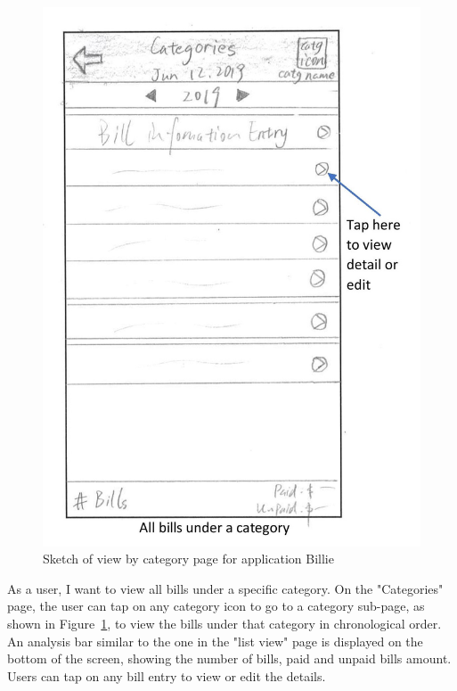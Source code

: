 \documentclass{sigchi}
\begin{document}
\begin{figure}[h!]
\centering
  \includegraphics[width=0.6\columnwidth]{19-view-by-category-page.jpg}
  \caption{Sketch of view by category page for application Billie}
  \label{fig:figure34}
\end{figure}
As a user, I want to view all bills under a specific category. On the "Categories" page, the user can tap on any category icon to go to a category sub-page, as shown in Figure~\ref{fig:figure34}, to view the bills under that category in chronological order. An analysis bar similar to the one in the "list view" page is displayed on the bottom of the screen, showing the number of bills, paid and unpaid bills amount. Users can tap on any bill entry to view or edit the details.
\end{document}
